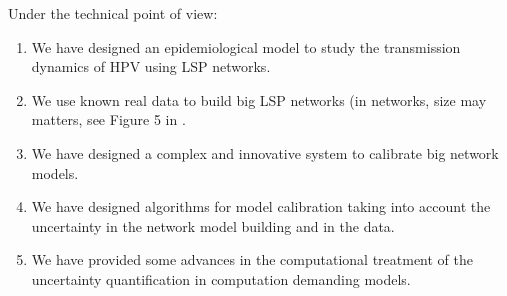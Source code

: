 Under the technical point of view:
\begin{enumerate}
	\item We have designed an epidemiological model to study the transmission dynamics of HPV using LSP networks.
	\item We use known real data to build big LSP networks (in networks, size may matters, see Figure 5 in \cite{villanueva2013epidemic}.
	\item We have designed a complex and innovative system to calibrate big network models.
	\item We have designed algorithms for model calibration taking into account the uncertainty in the network model building and in the data. 
	\item We have provided some advances in the computational treatment of the uncertainty quantification in computation demanding models.
\end{enumerate}
